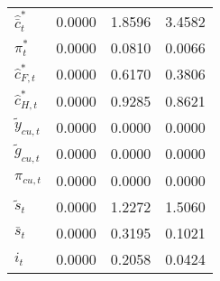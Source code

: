 \begin{center}
\begin{longtable}{lccc}
${\hat {\bar c}_t^*}  $	 & 	       0.0000	 & 	       1.8596	 & 	       3.4582 \\ 
${\pi_t^*}            $	 & 	       0.0000	 & 	       0.0810	 & 	       0.0066 \\ 
${\hat c_{F,t}^*}     $	 & 	       0.0000	 & 	       0.6170	 & 	       0.3806 \\ 
${\hat c_{H,t}^*}     $	 & 	       0.0000	 & 	       0.9285	 & 	       0.8621 \\ 
${\tilde y_{cu,t}}    $	 & 	       0.0000	 & 	       0.0000	 & 	       0.0000 \\ 
${\tilde g_{cu,t}}    $	 & 	       0.0000	 & 	       0.0000	 & 	       0.0000 \\ 
${\pi_{cu,t}}         $	 & 	       0.0000	 & 	       0.0000	 & 	       0.0000 \\ 
${\tilde s_t}         $	 & 	       0.0000	 & 	       1.2272	 & 	       1.5060 \\ 
${\bar s_t}           $	 & 	       0.0000	 & 	       0.3195	 & 	       0.1021 \\ 
${i_t}                $	 & 	       0.0000	 & 	       0.2058	 & 	       0.0424 \\ 
\end{longtable}
 \end{center}
